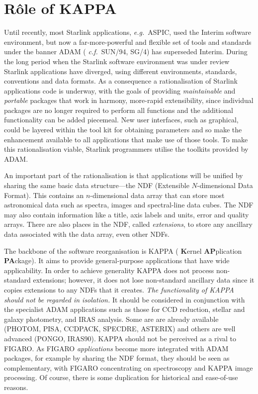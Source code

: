 {\section{R\^{o}le of KAPPA}
\label{ap:role}
Until recently, most Starlink applications, {\it e.g.}\ {\small ASPIC},
used the Interim software environment, but now a far-more-powerful and
flexible set of tools and standards under the banner {\small ADAM} ({\it
c.f.}~SUN/94, SG/4) has superseded Interim. During the long period when
the Starlink software environment was under review Starlink applications
have diverged, using different environments, standards, conventions and
data formats.  As a consequence a rationalisation of Starlink
applications code is underway, with the goals of providing {\em
maintainable\/} and {\em portable\/} packages that work in harmony,
more-rapid extensibility, since individual packages are no longer
required to perform all functions and the additional functionality can
be added piecemeal.  New user interfaces, such as graphical, could be
layered within the tool kit for obtaining parameters and so make the
enhancement available to all applications that make use of those tools. 
To make this rationalisation viable, Starlink programmers utilise the
toolkits provided by {\small ADAM}. 

An important part of the rationalisation is that applications will be
unified by sharing the same basic data structure---the NDF (Extensible
$N$-dimensional Data Format). This contains an $n$-dimensional data
array that can store most astronomical data such as spectra, images and
spectral-line data cubes. The NDF may also contain information like a
title, axis labels and units, error and quality arrays.  There are also
places in the NDF, called {\em extensions}, to store any ancillary data
associated with the data array, even other NDFs.

The backbone of the software reorganisation is {\small KAPPA} ({\bf
K}ernel {\bf AP}plication {\bf PA}ckage). It aims to provide
general-purpose applications that have wide applicability. In order to
achieve generality {\small KAPPA} does not process non-standard
extensions; however, it does not lose non-standard ancillary data since
it copies extensions to any NDFs that it creates. {\em The functionality
of {\small KAPPA} should not be regarded in isolation.} It should be
considered in conjunction with the specialist {\small ADAM} applications
such as those for CCD reduction, stellar and galaxy photometry, and IRAS
analysis.  Some are are already available (PHOTOM, PISA, CCDPACK,
SPECDRE, ASTERIX) and others are well advanced (PONGO, IRAS90). {\small
KAPPA} should not be perceived as a rival to {\small FIGARO}. As {\small
FIGARO} {\em applications\/} become more integrated with {\small ADAM}
packages, for example by sharing the NDF format, they should be seen as
complementary, with {\small FIGARO} concentrating on spectroscopy and
{\small KAPPA} image processing.  Of course, there is some duplication
for historical and ease-of-use reasons. 

}
